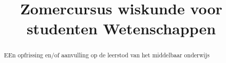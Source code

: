 \documentclass[numbers]{xourse}
\title{Zomercursus wiskunde voor studenten Wetenschappen}
\begin{document}
\begin{abstract}
	EEn opfrissing en/of aanvulling op de leerstod van het middelbaar onderwijs
\end{abstract}
\maketitle
{}
\end{document}
